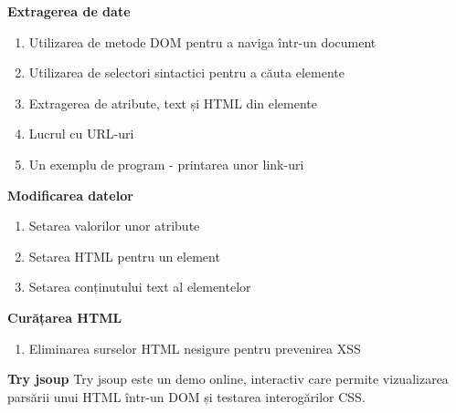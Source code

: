 \textbf{Extragerea de date}
\begin{enumerate}
	\item Utilizarea de metode DOM pentru a naviga într-un document
	\item Utilizarea de selectori sintactici pentru a căuta elemente
	\item Extragerea de atribute, text și HTML din elemente		
	\item Lucrul cu URL-uri
	\item Un exemplu de program - printarea unor link-uri
\end{enumerate}

\textbf{Modificarea datelor}
\begin{enumerate}
	\item Setarea valorilor unor atribute
	\item Setarea HTML pentru un element
	\item	Setarea conținutului text al elementelor
\end{enumerate}

\textbf{Curățarea HTML}
\begin{enumerate}
	\item Eliminarea surselor HTML nesigure pentru prevenirea XSS
\end{enumerate}

\textbf{Try jsoup}\newline
Try jsoup este un demo online, interactiv care permite vizualizarea parsării unui HTML într-un DOM și testarea interogărilor CSS.
